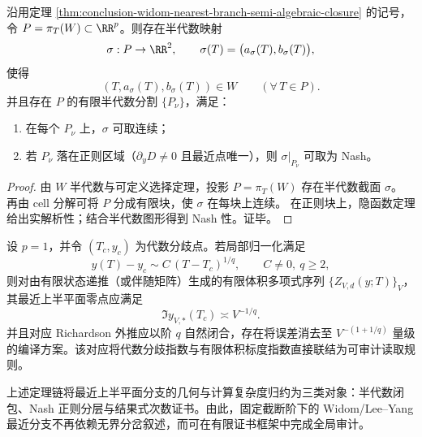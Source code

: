\begin{theorem}[最近分支的全局半代数可选取性]\label{thm:conclusion-widom-definable-selection-global}
沿用定理 \ref{thm:conclusion-widom-nearest-branch-semi-algebraic-closure} 的记号，令 \(P=\pi_T(W)\subset\RR^p\)。则存在半代数映射
\[
\sigma:P\to\RR^2,\qquad
\sigma(T)=\bigl(a_\sigma(T),b_\sigma(T)\bigr),
\]
使得
\[
(T,a_\sigma(T),b_\sigma(T))\in W\qquad(\forall\,T\in P).
\]
并且存在 \(P\) 的有限半代数分割 \(\{P_\nu\}\)，满足：
\begin{enumerate}
  \item 在每个 \(P_\nu\) 上，\(\sigma\) 可取连续；
  \item 若 \(P_\nu\) 落在正则区域（\(\partial_yD\neq 0\) 且最近点唯一），则 \(\sigma|_{P_\nu}\) 可取为 Nash。
\end{enumerate}
\end{theorem}
\begin{proof}
由 \(W\) 半代数与可定义选择定理，投影 \(P=\pi_T(W)\) 存在半代数截面 \(\sigma\)。
再由 cell 分解可将 \(P\) 分成有限块，使 \(\sigma\) 在每块上连续。
在正则块上，隐函数定理给出实解析性；结合半代数图形得到 Nash 性。证毕。
\end{proof}

\begin{conjecture}\label{conj:conclusion-widom-puiseux-scaling-volume-law}
设 \(p=1\)，并令 \((T_c,y_c)\) 为代数分歧点。若局部归一化满足
\[
y(T)-y_c\sim C\,(T-T_c)^{1/q},\qquad C\neq 0,\ q\ge 2,
\]
则对由有限状态递推（或伴随矩阵）生成的有限体积多项式序列 \(\{Z_{V,d}(y;T)\}_V\)，其最近上半平面零点应满足
\[
\Im y_{V,\ast}(T_c)\asymp V^{-1/q}.
\]
并且对应 Richardson 外推应以阶 \(q\) 自然闭合，存在将误差消去至 \(V^{-(1+1/q)}\) 量级的编译方案。该对应将代数分歧指数与有限体积标度指数直接联结为可审计读取规则。
\end{conjecture}

\begin{remark}[几何复杂度与可计算证书的统一接口]\label{rem:conclusion-widom-semi-algebraic-complexity-interface}
上述定理链将最近上半平面分支的几何与计算复杂度归约为三类对象：半代数闭包、Nash 正则分层与结果式次数证书。由此，固定截断阶下的 Widom/Lee--Yang 最近分支不再依赖无界分岔叙述，而可在有限证书框架中完成全局审计。
\end{remark}
